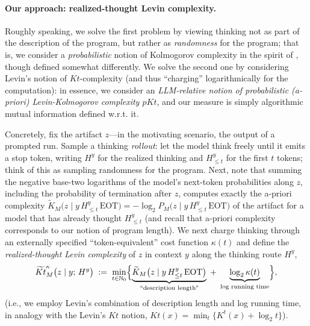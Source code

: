 \documentclass[letterpaper]{article} %
\theoremstyle{definition}
\theoremstyle{remark}
\newcommand{\EOT}{\mathrm{EOT}}
\begin{document}
\paragraph{Our approach: realized-thought Levin complexity.}
Roughly speaking, we solve the first problem by viewing thinking not as part of the description of the program, but rather as \emph{randomness} for the program; that is, we consider a \emph{probabilistic} notion of Kolmogorov complexity in the spirit of \cite{GKLO22}, though defined somewhat differently. We solve the second one by considering Levin's notion of $Kt$-complexity \cite{Levin73} (and thus ``charging'' logarithmically for the computation): in essence, we consider an \emph{LLM-relative notion of probabilistic (a-priori) Levin-Kolmogorov complexity $pKt$}, and our measure is simply algorithmic mutual information defined w.r.t. it.

Concretely, fix the artifact $z$---in the motivating scenario, the output of
a prompted run. 
Sample a thinking \emph{rollout}: let the model think freely until it emits a stop token,
writing $H^y$ for the realized thinking and $H^y_{\le t}$ for the first $t$ tokens; think of this as sampling randomness for the program. Next, note that summing the negative base-two logarithms of the model's next-token probabilities along $z$, including the probability of termination after $z$, computes exactly the
a-priori complexity
$\widetilde K_M\bigl(z \mid y\, H^y_{\le t}\, \EOT\bigr)
= -\log_2 P_M\bigl(z \mid y\, H^y_{\le t}\, \EOT\bigr)$
of the artifact for a model that has already thought $H^y_{\le t}$ (and recall that a-priori complexity corresponds to our notion of program length). We next charge thinking through an externally specified ``token-equivalent'' cost function $\kappa(t)$ and define the
\emph{realized-thought Levin complexity} of $z$ in context $y$ along the
thinking route $H^y$,
\begin{equation}\label{eq:introkt}
\widetilde{Kt}^{\kappa}_M\bigl(z \mid y;\, H^y\bigr)
\;:=\;
\min_{t \in \mathbb N_0}
\Bigl\{
\underbrace{\widetilde K_M\bigl(z \mid y\, H^y_{\le t}\, \EOT\bigr)}_{\text{``description length"}}
\;+\;
\underbrace{\log_2 \kappa(t)}_{\text{log running time}}
\Bigr\} ,
\end{equation}
(i.e., we employ Levin's combination of description length and log running
time, in analogy with the Levin's $Kt$ notion, $Kt(x) = \min_t \{K^t(x) + \log_2 t\}$).
\end{document}
